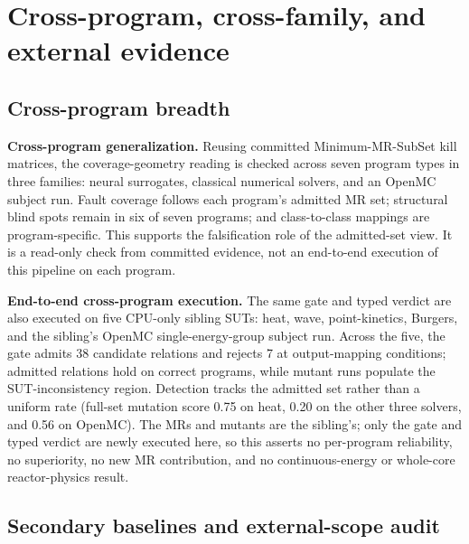 \documentclass[preprint,12pt]{elsarticle}
\begin{document}
\section{Cross-program, cross-family, and external evidence}
\label{app:external-evidence}

\subsection{Cross-program breadth}
\label{app:cross-program}

\textbf{Cross-program generalization.} Reusing committed Minimum-MR-SubSet kill matrices, the coverage-geometry reading is checked across seven program types in three families: neural surrogates, classical numerical solvers, and an OpenMC subject run. Fault coverage follows each program's admitted MR set; structural blind spots remain in six of seven programs; and class-to-class mappings are program-specific. This supports the falsification role of the admitted-set view. It is a read-only check from committed evidence, not an end-to-end execution of this pipeline on each program.

\textbf{End-to-end cross-program execution.} The same gate and typed verdict are also executed on five CPU-only sibling SUTs: heat, wave, point-kinetics, Burgers, and the sibling's OpenMC single-energy-group subject run. Across the five, the gate admits 38 candidate relations and rejects 7 at output-mapping conditions; admitted relations hold on correct programs, while mutant runs populate the SUT-inconsistency region. Detection tracks the admitted set rather than a uniform rate (full-set mutation score 0.75 on heat, 0.20 on the other three solvers, and 0.56 on OpenMC). The MRs and mutants are the sibling's; only the gate and typed verdict are newly executed here, so this asserts no per-program reliability, no superiority, no new MR contribution, and no continuous-energy or whole-core reactor-physics result.

\subsection{Secondary baselines and external-scope audit}
\label{app:secondary}
\label{subsec:llm-mr-baseline}
\end{document}
